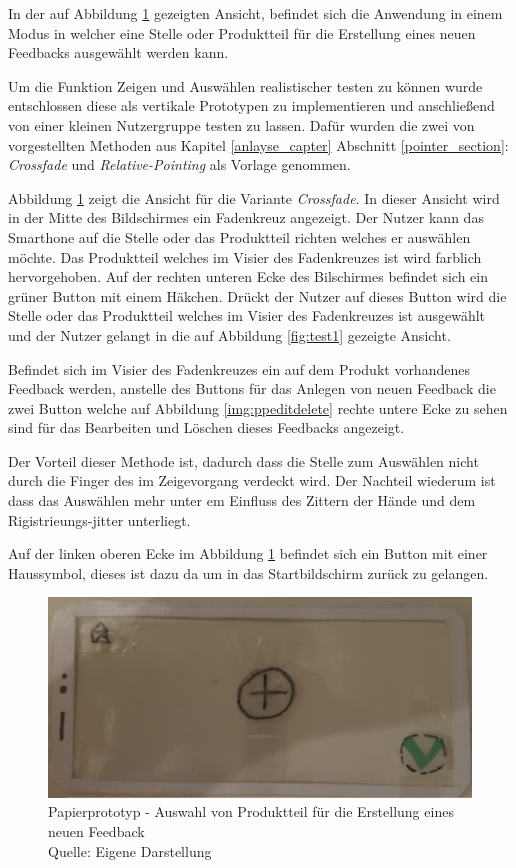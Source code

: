 In der auf Abbildung \ref{img:ppcreate} gezeigten Ansicht, befindet sich die Anwendung in einem Modus in welcher eine Stelle oder Produktteil für die Erstellung eines neuen Feedbacks ausgewählt werden kann. 

Um die Funktion Zeigen und Auswählen realistischer testen zu können wurde entschlossen diese als vertikale Prototypen zu implementieren und anschließend von einer kleinen Nutzergruppe testen zu lassen.
Dafür wurden die zwei von \citeauthor{Vincent2013} vorgestellten Methoden aus Kapitel \ref{anlayse_capter} Abschnitt \ref{pointer_section}: \textit{Crossfade} und \textit{Relative-Pointing} als Vorlage genommen.

Abbildung \ref{img:ppcreate} zeigt die Ansicht für die Variante \textit{Crossfade}. In dieser Ansicht wird in der Mitte des Bildschirmes ein Fadenkreuz angezeigt. Der Nutzer kann das Smarthone auf 
die Stelle oder das Produktteil richten welches er auswählen möchte. Das Produktteil welches im Visier des Fadenkreuzes ist wird farblich hervorgehoben. Auf der rechten unteren Ecke des Bilschirmes befindet 
sich ein grüner Button mit einem Häkchen. Drückt der Nutzer auf dieses Button wird die Stelle oder das Produktteil welches im Visier des Fadenkreuzes ist ausgewählt und der Nutzer gelangt in die auf Abbildung 
\ref{fig:test1} gezeigte Ansicht.

Befindet sich im Visier des Fadenkreuzes ein auf dem Produkt vorhandenes Feedback werden, anstelle des Buttons für das Anlegen von neuen Feedback die zwei Button welche auf Abbildung \ref{img:ppeditdelete}
rechte untere Ecke zu sehen sind für das Bearbeiten und Löschen dieses Feedbacks angezeigt. 

Der Vorteil dieser Methode ist, dadurch dass die Stelle zum Auswählen nicht durch die Finger des im Zeigevorgang verdeckt wird. Der Nachteil wiederum ist dass das Auswählen mehr unter em Einfluss des Zittern der 
Hände und dem Rigistrieungs-jitter unterliegt. 

Auf der linken oberen Ecke im Abbildung \ref{img:ppcreate} befindet sich ein Button mit einer Haussymbol, dieses ist dazu da um in das Startbildschirm zurück zu gelangen.

\begin{figure}[H]
	\centering
	\includegraphics[width=.7\textwidth]{resources/conception/lowfi_create.jpg}
	\caption{Papierprototyp - Auswahl von Produktteil für die Erstellung eines neuen Feedback \\Quelle: Eigene Darstellung}
	\label{img:ppcreate}
\end{figure}

